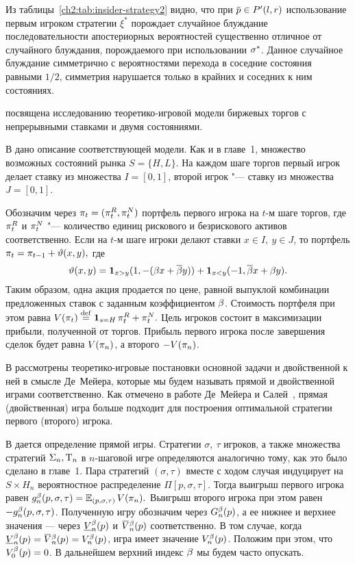 Из таблицы~\ref{ch2:tab:insider-strategy2} видно, что при $\p \in P'(l, r)$ использование первым игроком стратегии $\xi^*$ порождает случайное блуждание последовательности апостериорных вероятностей существенно отличное от случайного блуждания, порождаемого при использовании $\sigma^*$.
Данное случайное блуждание симметрично с вероятностями перехода в соседние состояния равными $1/2$, симметрия нарушается только в крайних и соседних к ним состояниях.

 посвящена исследованию теоретико-игровой модели биржевых торгов с непрерывными ставками и двумя состояниями. 

В  дано описание соответствующей модели.
Как и в главе~1, множество возможных состояний рынка $S = \{H, L\}$.
На каждом шаге торгов первый игрок делает ставку из множества $I = [0, 1]$, второй игрок "--- ставку из множества $J = [0, 1]$.

Обозначим через $\pi_{t} = (\pi_{t}^R, \pi_{t}^N)$ портфель первого игрока на $t$-м шаге торгов, где $\pi_{t}^R$ и $\pi_{t}^N$ "--- количество единиц рискового и безрискового активов соответственно.
Если на $t$-м шаге игроки делают ставки $x \in I,\ y \in J$, то портфель 
$
\pi_{t} = \pi_{t-1} + \vartheta(x, y),
$
где
\begin{equation}\label{ch3:eq:trans-mech}
  \vartheta(x, y) = \mathbf{1}_{x > y} (1, -(\beta x + {{\overline{\beta}}} y)) +
  \mathbf{1}_{x < y} (-1, {{\overline{\beta}}} x + \beta y).
\end{equation}
Таким образом, одна акция продается по цене, равной выпуклой комбинации предложенных ставок с заданным коэффициентом $\beta$.
Стоимость портфеля при этом равна
$
  V(\pi_{t}) \overset{\mathrm{def}}{=} \mathbf{1}_{s = H} \, \pi_{t}^R + \pi_{t}^N.
$
Цель игроков состоит в максимизации прибыли, полученной от торгов.
Прибыль первого игрока после завершения сделок будет равна $V(\pi_{n})$, а второго $-V(\pi_{n})$.

В  рассмотрены теоретико-игровые постановки основной задачи и двойственной к ней в смысле Де~Мейера, которые мы будем называть прямой и двойственной играми соответственно.
Как отмечено в работе Де~Мейера и Салей~\cite{demeyer02}, прямая (двойственная) игра больше подходит для построения оптимальной стратегии первого (второго) игрока.

В  дается определение прямой игры.
Стратегии $\sigma,\ \tau$ игроков, а также множества стратегий $\Sigma_n, \mathrm{T}_n$ в $n$-шаговой игре определяются аналогично тому, как это было сделано в главе~1.
Пара стратегий $(\sigma, \tau)$ вместе с ходом случая индуцирует на $S \times H_n$ вероятностное распределение $\Pi[p, \sigma, \tau]$.
Тогда выигрыш первого игрока равен
$
  g^{\beta}_n(p, \sigma, \tau) = \operatorname{\mathbb{E}}_{( p, \sigma, \tau )} V(\pi_{n}).
$
Выигрыш второго игрока при этом равен $-g^{\beta}_n(p, \sigma, \tau)$.
Полученную игру обозначим через $G^{\beta}_n(p)$, а ее нижнее и верхнее значения --- через $\LV[\Co]{n}(p)$ и $\HV[\Co]{n}(p)$ соответственно.
В том случае, когда $\LV[\Co]{n}(p) = \HV[\Co]{n}(p) = V^\Co_n(p)$, игра имеет значение $V^{\beta}_n(p)$.
Положим при этом, что $V^{\beta}_0(p) = 0$.
В дальнейшем верхний индекс $\beta$ мы будем часто опускать.

